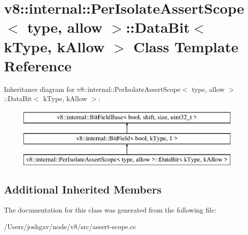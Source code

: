 \hypertarget{classv8_1_1internal_1_1_per_isolate_assert_scope_1_1_data_bit}{}\section{v8\+:\+:internal\+:\+:Per\+Isolate\+Assert\+Scope$<$ type, allow $>$\+:\+:Data\+Bit$<$ k\+Type, k\+Allow $>$ Class Template Reference}
\label{classv8_1_1internal_1_1_per_isolate_assert_scope_1_1_data_bit}
Inheritance diagram for v8\+:\+:internal\+:\+:Per\+Isolate\+Assert\+Scope$<$ type, allow $>$\+:\+:Data\+Bit$<$ k\+Type, k\+Allow $>$\+:\begin{figure}[H]
\begin{center}
\leavevmode
\includegraphics[height=3.000000cm]{classv8_1_1internal_1_1_per_isolate_assert_scope_1_1_data_bit}
\end{center}
\end{figure}
\subsection*{Additional Inherited Members}


The documentation for this class was generated from the following file\+:\begin{DoxyCompactItemize}
\item 
/\+Users/joshgav/node/v8/src/assert-\/scope.\+cc\end{DoxyCompactItemize}

